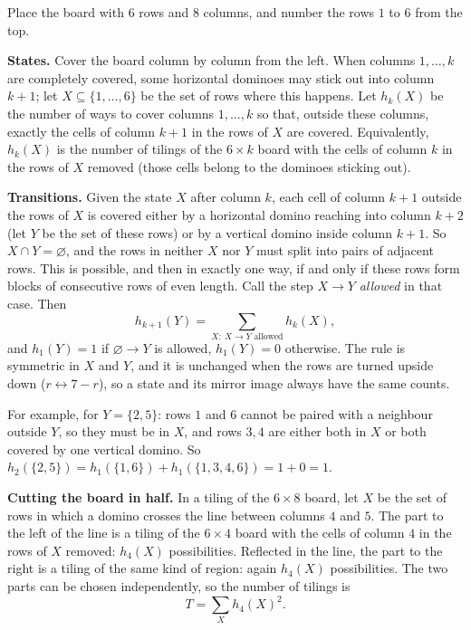 Place the board with $6$ rows and $8$ columns, and number the rows $1$ to $6$ from the top.

\textbf{States.} Cover the board column by column from the left. When columns $1,\dots,k$ are completely covered, some horizontal dominoes may stick out into column $k+1$; let $X\subseteq\{1,\dots,6\}$ be the set of rows where this happens. Let $h_k(X)$ be the number of ways to cover columns $1,\dots,k$ so that, outside these columns, exactly the cells of column $k+1$ in the rows of $X$ are covered. Equivalently, $h_k(X)$ is the number of tilings of the $6\times k$ board with the cells of column $k$ in the rows of $X$ removed (those cells belong to the dominoes sticking out).

\textbf{Transitions.} Given the state $X$ after column $k$, each cell of column $k+1$ outside the rows of $X$ is covered either by a horizontal domino reaching into column $k+2$ (let $Y$ be the set of these rows) or by a vertical domino inside column $k+1$. So $X\cap Y=\varnothing$, and the rows in neither $X$ nor $Y$ must split into pairs of adjacent rows. This is possible, and then in exactly one way, if and only if these rows form blocks of consecutive rows of even length. Call the step $X\to Y$ \emph{allowed} in that case. Then
\[h_{k+1}(Y)=\sum_{X:\ X\to Y\text{ allowed}}h_k(X),\]
and $h_1(Y)=1$ if $\varnothing\to Y$ is allowed, $h_1(Y)=0$ otherwise. The rule is symmetric in $X$ and $Y$, and it is unchanged when the rows are turned upside down ($r\leftrightarrow7-r$), so a state and its mirror image always have the same counts.

For example, for $Y=\{2,5\}$: rows $1$ and $6$ cannot be paired with a neighbour outside $Y$, so they must be in $X$, and rows $3,4$ are either both in $X$ or both covered by one vertical domino. So $h_2(\{2,5\})=h_1(\{1,6\})+h_1(\{1,3,4,6\})=1+0=1$.

\textbf{Cutting the board in half.} In a tiling of the $6\times8$ board, let $X$ be the set of rows in which a domino crosses the line between columns $4$ and $5$. The part to the left of the line is a tiling of the $6\times4$ board with the cells of column $4$ in the rows of $X$ removed: $h_4(X)$ possibilities. Reflected in the line, the part to the right is a tiling of the same kind of region: again $h_4(X)$ possibilities. The two parts can be chosen independently, so the number of tilings is
\[T=\sum_{X}h_4(X)^2.\]

